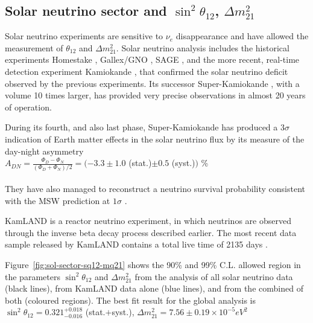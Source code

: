 \documentclass[english]{article}
\begin{document}
\subsection{Solar neutrino sector and $\sin^{2}{\theta_{12}}$, $\Delta{m^{2}_{21}}$}
	
    Solar neutrino experiments are sensitive to $\nu_{e}$ disappearance and have allowed the measurement of $\theta_{12}$ and $\Delta{m^{2}_{21}}$. Solar neutrino analysis includes the historical experiments Homestake \cite{davis1968}, Gallex/GNO \cite{gallex1999}, SAGE \cite{sage1991}, and the more recent, real-time detection experiment Kamiokande \cite{kamiokande}, that confirmed the solar neutrino deficit observed by the previous experiments. Its successor Super-Kamiokande \cite{superk}, with a volume 10 times larger, has provided very precise observations in almost 20 years of operation.
    
    During its fourth, and also last phase, Super-Kamiokande has produced a $3\sigma$ indication of Earth matter effects in the solar neutrino flux by its measure of the day-night asymmetry \cite{superk2016} \cite{superk2016-2} \\
    
    $A_{DN} = \frac{\Phi_{D}-\Phi_{N}}{(\Phi_{D}+\Phi_{N})/2} = (-3.3\pm 1.0$ (stat.)$\pm 0.5$ (syst.)$)$ \% \\ \\
    They have also managed to reconstruct a neutrino survival probability consistent with the MSW prediction at $1\sigma$ \cite{oscmatter} \cite{oscmatter2}.
    
    KamLAND is a reactor neutrino experiment, in which neutrinos are observed through the inverse beta decay process described earlier. The most recent data sample released by KamLAND contains a total live time of 2135 days \cite{kamlanddata}. 
    
    Figure~\ref{fig:sol-sector-sq12-mq21} shows the 90\% and 99\% C.L. allowed region in the parameters $\sin^{2}{\theta_{12}}$ and $\Delta{m^{2}_{21}}$ from the analysis of all solar neutrino data (black lines), from KamLAND data alone (blue lines), and from the combined of both (coloured regions). The best fit result for the global analysis is\\
    
    $\sin^{2}{\theta_{12}} = 0.321^{+0.018}_{-0.016}$ (stat.$+$syst.), 
    $\Delta{m_{21}^{2}} = 7.56\pm 0.19 \times 10^{-5} eV^{2}$\\
    
\end{document}
